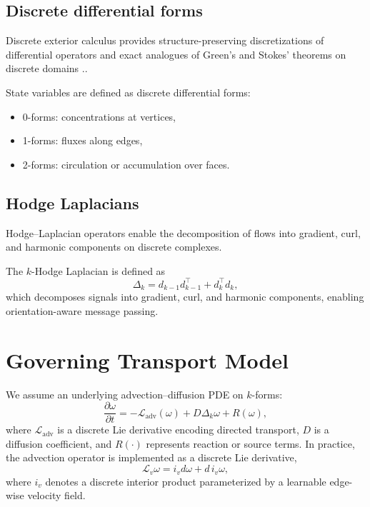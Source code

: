 \documentclass[10pt,article]{article}
\begin{document}
\subsection{Discrete differential forms}

Discrete exterior calculus provides structure-preserving discretizations of differential operators and exact analogues of Green's and Stokes' theorems on discrete domains \cite{trask2020decml,arnold2018feec}..

State variables are defined as discrete differential forms:
\begin{itemize}[leftmargin=1.5em]
    \item 0-forms: concentrations at vertices,
    \item 1-forms: fluxes along edges,
    \item 2-forms: circulation or accumulation over faces.
\end{itemize}

\subsection{Hodge Laplacians}

Hodge–Laplacian operators enable the decomposition of flows into gradient, curl, and harmonic components on discrete complexes.

The $k$-Hodge Laplacian is defined as
\begin{equation}
\Delta_k = d_{k-1} d_{k-1}^\top + d_k^\top d_k,
\end{equation}
which decomposes signals into gradient, curl, and harmonic components, enabling orientation-aware message passing.


\section{Governing Transport Model}

We assume an underlying advection--diffusion PDE on $k$-forms:
\begin{equation}
\frac{\partial \omega}{\partial t}
= - \mathcal{L}_{\text{adv}}(\omega)
+ D \Delta_k \omega
+ R(\omega),
\end{equation}
where $\mathcal{L}_{\text{adv}}$ is a discrete Lie derivative encoding directed transport, $D$ is a diffusion coefficient, and $R(\cdot)$ represents reaction or source terms.
In practice, the advection operator is implemented as a discrete Lie derivative,
\[
\mathcal{L}_{v}\omega = i_v d\omega + d\, i_v \omega,
\]
where \(i_v\) denotes a discrete interior product parameterized by a learnable edge-wise velocity field.
\end{document}
